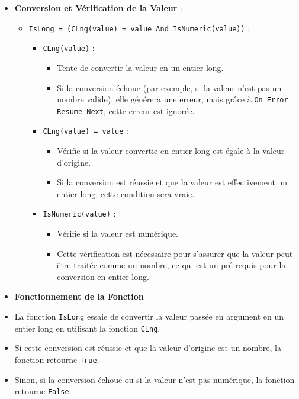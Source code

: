 \documentclass[a4paper, oneside, 12pt, final]{extreport}
\begin{document}
\begin{itemize}
    \item \textbf{Conversion et Vérification de la Valeur} :
    \begin{itemize}
        \item \texttt{IsLong = (CLng(value) = value And IsNumeric(value))} :
        \begin{itemize}
            \item \texttt{CLng(value)} : 
            \begin{itemize}
                \item Tente de convertir la valeur en un entier long. 
                \item Si la conversion échoue (par exemple, si la valeur n'est pas un nombre valide), elle générera une erreur, mais grâce à \texttt{On Error Resume Next}, cette erreur est ignorée.
            \end{itemize}
            \item \texttt{CLng(value) = value} : 
            \begin{itemize}
                \item Vérifie si la valeur convertie en entier long est égale à la valeur d'origine. 
                \item Si la conversion est réussie et que la valeur est effectivement un entier long, cette condition sera vraie.
            \end{itemize}
            \item \texttt{IsNumeric(value)} : 
            \begin{itemize}
                \item Vérifie si la valeur est numérique. 
                \item Cette vérification est nécessaire pour s'assurer que la valeur peut être traitée comme un nombre, ce qui est un pré-requis pour la conversion en entier long.
            \end{itemize}
        \end{itemize}
    \end{itemize}

\item\textbf{Fonctionnement de la Fonction}
\end{itemize}

\begin{itemize}
    \item La fonction \texttt{IsLong} essaie de convertir la valeur passée en argument en un entier long en utilisant la fonction \texttt{CLng}.
    \item Si cette conversion est réussie et que la valeur d'origine est un nombre, la fonction retourne \texttt{True}.
    \item Sinon, si la conversion échoue ou si la valeur n'est pas numérique, la fonction retourne \texttt{False}.
\end{itemize}
\end{document}
